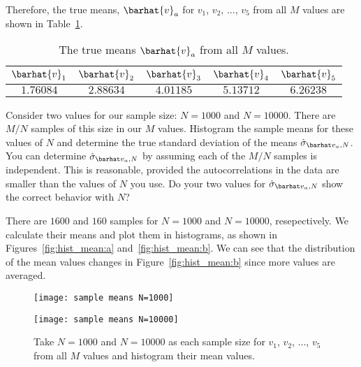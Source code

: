 Therefore, the true means, \(\barhat{v}_a\) for \(v_1\), \(v_2\), \(\ldots\), \(v_5\) from
all \(M\) values are shown in Table~\ref{tab:truemean}.

\begin{table}[H]
    \centering
    \caption{The true means \(\barhat{v}_a\) from all \(M\) values.}
    \label{tab:truemean}
    \begin{tabular}{@{}ccccc@{}}
        \toprule
        \(\barhat{v}_1\) & \(\barhat{v}_2\) & \(\barhat{v}_3\) & \(\barhat{v}_4\) & \(\barhat{v}_5\) \\
        \midrule
        \(1.76084\)      & \(2.88634\)      & \(4.01185\)      & \(5.13712\)      & \(6.26238\)      \\
        \bottomrule
    \end{tabular}
\end{table}

\Question{} Consider two values for our sample size: \(N = 1000\) and \(N = 10000\). There are
\(M/N\) samples of this size in our \(M\) values. Histogram the sample means for these values of
\(N\) and determine the true standard deviation of the means \(\sgbar{a}\).
You can determine \(\sgbar{a}\) by assuming each of the \(M/N\) samples is
independent. This is reasonable, provided the autocorrelations in the data are smaller than
the values of \(N\) you use. Do your two values for \(\sgbar{a}\) show the
correct behavior with \(N\)?

\Answer{}
There are \(1600\) and \(160\) samples for \(N = 1000\) and \(N = 10000\), resepectively.
We calculate their means and plot them in histograms, as shown in
Figures~\ref{fig:hist_mean:a} and~\ref{fig:hist_mean:b}.
We can see that the distribution of the mean values changes in Figure~\ref{fig:hist_mean:b}
since more values are averaged.

\begin{figure}[H]
    \centering
    \begin{minipage}[t]{0.8\linewidth}
        \centering
        \texttt{[image: sample means N=1000]}
        \label{fig:hist_mean:a}
    \end{minipage}
    \hfill
    \begin{minipage}[t]{0.8\linewidth}
        \centering
        \texttt{[image: sample means N=10000]}
        \label{fig:hist_mean:b}
    \end{minipage}
    \caption{Take \(N = 1000\) and \(N = 10000\) as each sample size
        for \(v_1\), \(v_2\), \(\ldots\), \(v_5\) from all \(M\) values
        and histogram their mean values.}
    \label{fig:hist_mean}
\end{figure}

